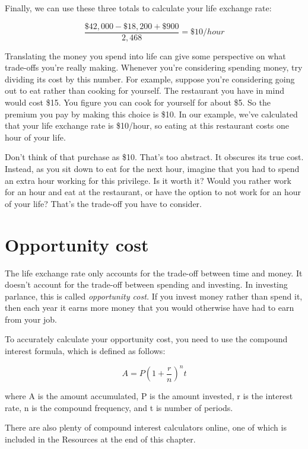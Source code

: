 Finally, we can use these three totals to calculate your life exchange rate:

\begin{equation}
	\frac{\$42,000 - \$18,200 + \$900}{2,468} = \$10/hour
\end{equation}

Translating the money you spend into life can give some perspective on what trade-offs you're really making. Whenever you're considering spending money, try dividing its cost by this number. For example, suppose you're considering going out to eat rather than cooking for yourself. The restaurant you have in mind would cost \$15. You figure you can cook for yourself for about \$5. So the premium you pay by making this choice is \$10. In our example, we've calculated that your life exchange rate is \$10/hour, so eating at this restaurant costs one hour of your life.

Don't think of that purchase as \$10. That's too abstract. It obscures its true cost. Instead, as you sit down to eat for the next hour, imagine that you had to spend an extra hour working for this privilege. Is it worth it? Would you rather work for an hour and eat at the restaurant, or have the option to not work for an hour of your life? That's the trade-off you have to consider.

\section{Opportunity cost}
The life exchange rate only accounts for the trade-off between time and money. It doesn't account for the trade-off between spending and investing. In investing parlance, this is called \emph{opportunity cost.} If you invest money rather than spend it, then each year it earns more money that you would otherwise have had to earn from your job.

To accurately calculate your opportunity cost, you need to use the compound interest formula, which is defined as follows:

\begin{equation}
	A = P(1 + \frac{r}{n})^nt
\end{equation}

where A is the amount accumulated, P is the amount invested, r is the interest rate, n is the compound frequency, and t is number of periods.

There are also plenty of compound interest calculators online, one of which is included in the Resources at the end of this chapter.

